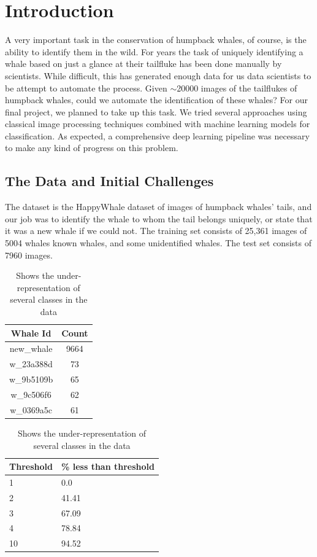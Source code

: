 \section{Introduction}
A very important task in the conservation of humpback whales, of course, is the ability to identify them in the wild. For years the task of uniquely identifying a whale based on just a glance at their tailfluke has been done manually by scientists. While difficult, this has generated enough data for us data scientists to be attempt to automate the process. Given $\sim$20000 images of the tailflukes of humpback whales, could we automate the identification of these whales? For our final project, we planned to take up this task. We tried several approaches using classical image processing techniques combined with machine learning models for classification. As expected, a comprehensive deep learning pipeline was necessary to make any kind of progress on this problem.

\subsection{The Data and Initial Challenges}

The dataset is the HappyWhale dataset of images of humpback whales' tails, and our job was to identify the whale to whom the tail belongs uniquely, or state that it was a new whale if we could not. The training set consists of 25,361 images of 5004 whales known whales, and some unidentified whales. The test set consists of 7960 images.\\

\begin{table}[h!]
	\centering
	\begin{tabular}{|c|c|}\hline
		\textbf{Whale Id} & \textbf{Count}\\ \hline
		new\_whale  & 9664\\ \hline
		w\_23a388d  & 73\\ \hline
		w\_9b5109b  & 65\\ \hline
		w\_9c506f6  & 62\\ \hline
		w\_0369a5c  & 61\\ \hline
	\end{tabular}
	\begin{tabular}{|p{2cm}|p{2.5cm}|}\hline
		\textbf{Threshold} & \textbf{\% less than threshold}\\ \hline
		1  & 0.0 \\ \hline
		2  & 41.41\\ \hline
		3  & 67.09\\ \hline
		4  & 78.84\\ \hline
		10 & 94.52\\ \hline
	\end{tabular}
	\caption{\label{tab:counts}Shows the class imbalance near the upper end}
	\caption{\label{tab:unders}Shows the under-representation of several classes in the data}
\end{table}

